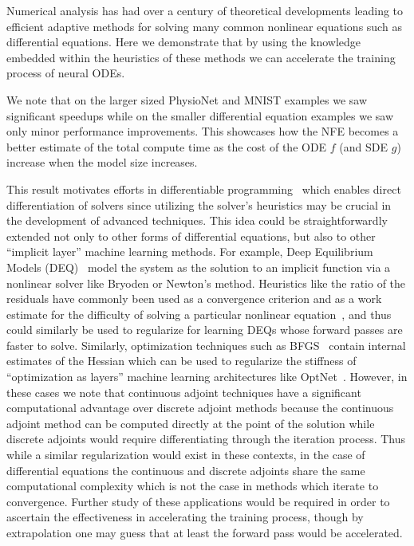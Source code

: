 Numerical analysis has had over a century of theoretical developments leading to efficient adaptive methods for solving many common nonlinear equations such as differential equations. Here we demonstrate that by using the knowledge embedded within the heuristics of these methods we can accelerate the training process of neural ODEs.

We note that on the larger sized PhysioNet and MNIST examples we saw significant speedups while on the smaller differential equation examples we saw only minor performance improvements. This showcases how the NFE becomes a better estimate of the total compute time as the cost of the ODE $f$ (and SDE $g$) increase when the model size increases.

This result motivates efforts in differentiable programming~\citep{wang2018backpropagation, abadi2019simple, rackauckas2020generalized} which enables direct differentiation of solvers since utilizing the solver's heuristics may be crucial in the development of advanced techniques. This idea could be straightforwardly extended not only to other forms of differential equations, but also to other ``implicit layer'' machine learning methods. For example, Deep Equilibrium Models (DEQ)~\citep{bai_deep_2019} model the system as the solution to an implicit function via a nonlinear solver like Bryoden or Newton's method. Heuristics like the ratio of the residuals have commonly been used as a convergence criterion and as a work estimate for the difficulty of solving a particular nonlinear equation~\citep{wanner1996solving}, and thus could similarly be used to regularize for learning DEQs whose forward passes are faster to solve. Similarly, optimization techniques such as BFGS~\citep{kelley1999iterative} contain internal estimates of the Hessian which can be used to regularize the stiffness of ``optimization as layers'' machine learning architectures like OptNet~\citep{amos2017optnet}. However, in these cases we note that continuous adjoint techniques have a significant computational advantage over discrete adjoint methods because the continuous adjoint method can be computed directly at the point of the solution while discrete adjoints would require differentiating through the iteration process. Thus while a similar regularization would exist in these contexts, in the case of differential equations the continuous and discrete adjoints share the same computational complexity which is not the case in methods which iterate to convergence. Further study of these applications would be required in order to ascertain the effectiveness in accelerating the training process, though by extrapolation one may guess that at least the forward pass would be accelerated.

